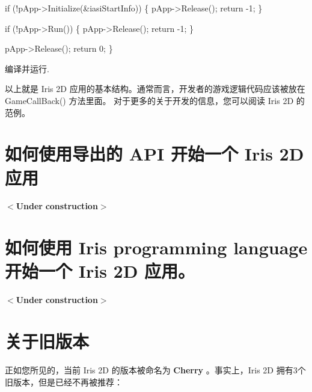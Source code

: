 \begin{DoxyItemize}
\begin{DoxyCode}
    \textcolor{keywordflow}{if} (!pApp->Initialize(&iasiStartInfo)) \{
      pApp->Release();
      \textcolor{keywordflow}{return} -1;
      \}

    \textcolor{keywordflow}{if} (!pApp->Run()) \{
      pApp->Release();
      \textcolor{keywordflow}{return} -1;
    \}

    pApp->Release();
    \textcolor{keywordflow}{return} 0;
\}
\end{DoxyCode}
 \item 编译并运行.\end{DoxyItemize}
以上就是 Iris 2D 应用的基本结构。通常而言，开发者的游戏逻辑代码应该被放在 Game\+Call\+Back() 方法里面。 对于更多的关于开发的信息，您可以阅读 Iris 2D 的范例。\hypertarget{index_install_sec_2}{}\section{如何使用导出的 A\+P\+I 开始一个 Iris 2\+D 应用}\label{index_install_sec_2}
\begin{DoxyParagraph}{}
$<${\bfseries Under} {\bfseries construction$>$} 
\end{DoxyParagraph}
\hypertarget{index_install_sec_3}{}\section{如何使用 Iris programming language 开始一个 Iris 2\+D 应用。}\label{index_install_sec_3}
\begin{DoxyParagraph}{}
$<${\bfseries Under} {\bfseries construction$>$} 
\end{DoxyParagraph}
\hypertarget{index_name_stg}{}\section{关于旧版本}\label{index_name_stg}
正如您所见的，当前 Iris 2D 的版本被命名为 {\bfseries  Cherry }。事实上，\+Iris 2D 拥有3个旧版本，但是已经不再被推荐：

